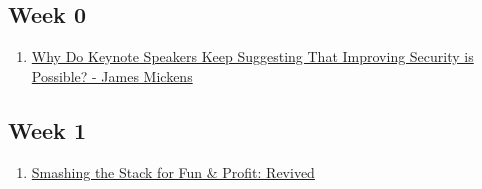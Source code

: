 \documentclass[12pt,letterpaper]{article}
\begin{document}
	\subsection*{Week 0}
	\begin{enumerate}
		\item \href{https://www.youtube.com/watch?v=ajGX7odA87k}{Why Do Keynote Speakers Keep Suggesting That Improving Security is Possible? - James Mickens}
	\end{enumerate}

	\subsection*{Week 1}
	\begin{enumerate}
		\item \href{https://avicoder.me/2016/02/01/smashsatck-revived/}{Smashing the Stack for Fun \& Profit: Revived}
	\end{enumerate}
\end{document}
